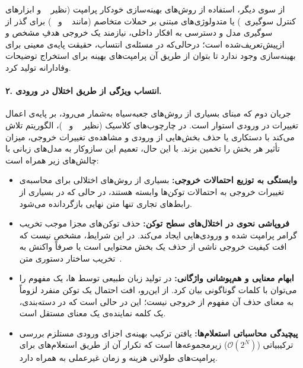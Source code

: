 از سوی دیگر، استفاده از روش‌های بهینه‌سازی خودکار پرامپت (نظیر ~\cite{zhou2023large} و ابزارهای کنترل سوگیری~\cite{clemmer2024precisedebias}) یا متدولوژی‌های مبتنی بر حملات متخاصم (مانند ~\cite{zou2023universal} و ~\cite{mangaokar2024prp}) برای گذر از سوگیری مدل و دسترسی به افکار داخلی، نیازمند یک خروجی هدفِ مشخص و ازپیش‌تعریف‌شده است؛ درحالی‌که در مسئله‌ی انتساب، حقیقت پایه‌ی معینی برای بهینه‌سازی وجود ندارد تا بتوان از طریق آن پرامپت‌های بهینه برای استخراج توضیحات وفادارانه تولید کرد.

\paragraph{۲. انتساب ویژگی از طریق اختلال در ورودی.}
جریان دوم که مبنای بسیاری از روش‌های جعبه‌سیاه به‌شمار می‌رود، بر پایه‌ی اعمال تغییرات در ورودی استوار است. در چارچوب‌های کلاسیک (نظیر ~\cite{ribeiro2016lime} و ~\cite{lundberg2017unified})، الگوریتم تلاش می‌کند با دستکاری یا حذف بخش‌هایی از ورودی و مشاهده‌ی تغییرات خروجی، میزان تأثیر هر بخش را تخمین بزند. با این حال، تعمیم این سازوکار به مدل‌های زبانی با چالش‌های زیر همراه است:
\begin{itemize}
    \item \textbf{وابستگی به توزیع احتمالات خروجی:} بسیاری از روش‌های اختلالی برای محاسبه‌ی تغییرات خروجی به احتمالات توکن‌ها وابسته هستند، در حالی که در بسیاری از رابط‌های تجاری تنها متن نهایی بازگردانده می‌شود.
    \vspace{-0.15cm}
    \item \textbf{فروپاشی نحوی در اختلال‌های سطح توکن:} حذف توکن‌های مجزا موجب تخریب گرامر پرامپت شده و ورودی‌هایی  ایجاد می‌کند. در این شرایط، مشخص نیست که افت کیفیت خروجی ناشی از حذف یک بخش محتوایی است یا صرفاً واکنش به تخریب ساختار دستوری متن~\cite{madsen2022evaluating}.
    \vspace{-0.15cm}
    \item \textbf{ابهام معنایی و هم‌پوشانی واژگانی:} در تولید زبان طبیعی توسط ها، یک مفهوم را می‌توان با کلمات گوناگونی بیان کرد. از این‌رو، افت احتمال یک توکن منفرد لزوماً به معنای حذف آن مفهوم از خروجی نیست؛ این در حالی است که در دسته‌بندی، یک کلمه نماینده‌ی یک معنای مستقل است.
    \vspace{-0.15cm}
    \item \textbf{پیچیدگی محاسباتی استعلام‌ها:} یافتن ترکیب بهینه‌ی اجزای ورودی مستلزم بررسی ترکیبیاتی ($\mathcal{O}(2^N)$) زیرمجموعه‌ها است که تکرار آن از طریق استعلام‌های  برای پرامپت‌های طولانی هزینه و زمان غیرعملی به همراه دارد.
\end{itemize}

